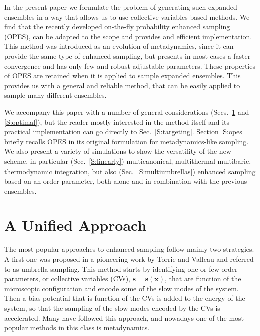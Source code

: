 \documentclass[aps,prx,reprint,superscriptaddress]{revtex4-1} %
\begin{document}
In the present paper we formulate the problem of generating such expanded ensembles in a way that allows us to use collective-variables-based methods.
We find that the recently developed on-the-fly probability enhanced sampling\cite{Invernizzi2020} (OPES), can be adapted to the scope and provides and efficient implementation.
This method was introduced as an evolution of metadynamics\cite{Laio2002}, since it can provide the same type of enhanced sampling, but presents in most cases a faster convergence and has only few and robust adjustable parameters.
These properties of OPES are retained when it is applied to sample expanded ensembles.
This provides us with a general and reliable method, that can be easily applied to sample many different ensembles.

We accompany this paper with a number of general considerations (Secs.~\ref{S:unified} and \ref{S:optimal}), but the reader mostly interested in the method itself and its practical implementation can go directly to Sec.~\ref{S:targeting}.
Section \ref{S:opes} briefly recalls OPES in its original formulation for metadynamics-like sampling.
We also present a variety of simulations to show the versatility of the new scheme, in particular (Sec.~\ref{S:linearly}) multicanonical, multithermal-multibaric, thermodynamic integration, but also (Sec.~\ref{S:multiumbrellas}) enhanced sampling based on an order parameter, both alone and in combination with the previous ensembles.


\section{A Unified Approach}\label{S:unified}
The most popular approaches to enhanced sampling follow mainly two strategies.
A first one was proposed in a pioneering work by Torrie and Valleau and referred to as umbrella sampling\cite{Torrie1974,Torrie1977}.
This method starts by identifying one or few order parameters, or collective variables (CVs), $\mathbf{s}=\mathbf{s}(\mathbf{x})$, that are function of the microscopic configuration and encode some of the slow modes of the system.
Then a bias potential that is function of the CVs is added to the energy of the system, so that the sampling of the slow modes encoded by the CVs is accelerated.
Many have followed this approach, and nowadays one of the most popular methods in this class is metadynamics\cite{Laio2002}.
\end{document}
